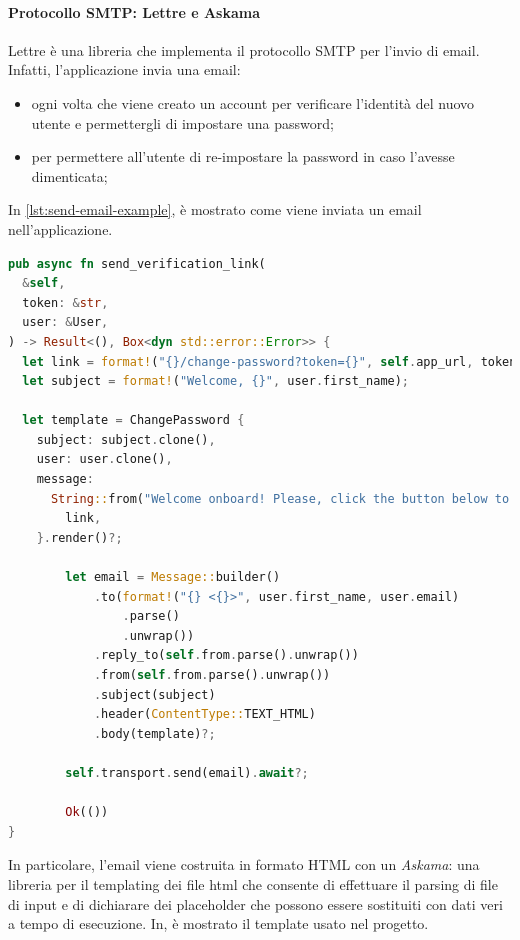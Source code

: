 \documentclass{article}
\begin{document}
\paragraph{Protocollo SMTP: Lettre e Askama} Lettre è una libreria che implementa il protocollo SMTP 
per l'invio di email. Infatti, l'applicazione invia una email:
\begin{itemize}
  \item ogni volta che viene creato un account per verificare l'identità del nuovo
    utente e permettergli di impostare una password;
  \item per permettere all'utente di re-impostare la password in caso l'avesse dimenticata;
\end{itemize}

In \cref{lst:send-email-example}, è mostrato come viene inviata un email nell'applicazione. 

\begin{lstlisting}[language=Rust, style=boxed, label={lst:send-email-example}, captionpos=b,caption={Esempio di invio email in Rust con Lettre}]
pub async fn send_verification_link(
  &self,
  token: &str,
  user: &User,
) -> Result<(), Box<dyn std::error::Error>> {
  let link = format!("{}/change-password?token={}", self.app_url, token);
  let subject = format!("Welcome, {}", user.first_name);

  let template = ChangePassword {
    subject: subject.clone(),
    user: user.clone(),
    message:
      String::from("Welcome onboard! Please, click the button below to set a password for your account"),
        link,
    }.render()?;

        let email = Message::builder()
            .to(format!("{} <{}>", user.first_name, user.email)
                .parse()
                .unwrap())
            .reply_to(self.from.parse().unwrap())
            .from(self.from.parse().unwrap())
            .subject(subject)
            .header(ContentType::TEXT_HTML)
            .body(template)?;

        self.transport.send(email).await?;

        Ok(())
}

\end{lstlisting}
In particolare, l'email viene costruita in formato HTML con un \textit{Askama}: una libreria 
per il templating dei file html che consente di effettuare il parsing di file di input e di 
dichiarare dei placeholder che possono essere sostituiti con dati veri a tempo di esecuzione.  
In, è mostrato il template usato nel progetto. 
\end{document}
